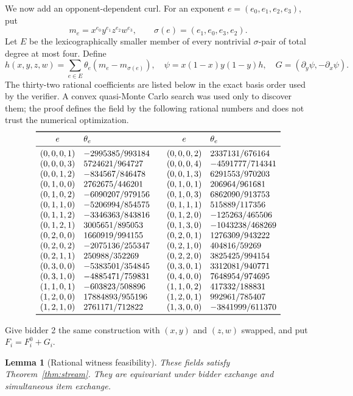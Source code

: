 \documentclass[11pt]{article}
\newtheorem{lemma}[theorem]{Lemma}
\begin{document}
We now add an opponent-dependent curl.  For an exponent
\(e=(e_0,e_1,e_2,e_3)\), put
\[
m_e=x^{e_0}y^{e_1}z^{e_2}w^{e_3},\qquad
\sigma(e)=(e_1,e_0,e_3,e_2).
\]
Let \(E\) be the lexicographically smaller member of every nontrivial
\(\sigma\)-pair of total degree at most four.  Define
\[
h(x,y,z,w)=\sum_{e\in E}\theta_e(m_e-m_{\sigma(e)}),
\quad
\psi=x(1-x)y(1-y)h,
\quad
G=(\partial_y\psi,-\partial_x\psi).
\]
The thirty-two rational coefficients are listed below in the exact basis
order used by the verifier.  A convex quasi-Monte Carlo search was used only
to discover them; the proof defines the field by the following rational
numbers and does not trust the numerical optimization.
\[
\begin{array}{cl@{\qquad}cl}
\toprule
e&\theta_e&e&\theta_e\\
\midrule
(0,0,0,1)&-2995385/993184&(0,0,0,2)&2337131/676164\\
(0,0,0,3)&5724621/964727&(0,0,0,4)&-4591777/714341\\
(0,0,1,2)&-834567/846478&(0,0,1,3)&6291553/970203\\
(0,1,0,0)&2762675/446201&(0,1,0,1)&206964/961681\\
(0,1,0,2)&-6090207/979156&(0,1,0,3)&6862090/913753\\
(0,1,1,0)&-5206994/854575&(0,1,1,1)&515889/117356\\
(0,1,1,2)&-3346363/843816&(0,1,2,0)&-125263/465506\\
(0,1,2,1)&3005651/895053&(0,1,3,0)&-1043238/468269\\
(0,2,0,0)&1660919/994155&(0,2,0,1)&1276309/943222\\
(0,2,0,2)&-2075136/255347&(0,2,1,0)&404816/59269\\
(0,2,1,1)&250988/352269&(0,2,2,0)&3825425/994154\\
(0,3,0,0)&-5383501/354845&(0,3,0,1)&3312081/940771\\
(0,3,1,0)&-4885471/759831&(0,4,0,0)&7648954/974695\\
(1,1,0,1)&-603823/508896&(1,1,0,2)&417332/188831\\
(1,2,0,0)&17884893/955196&(1,2,0,1)&992961/785407\\
(1,2,1,0)&2761171/712822&(1,3,0,0)&-3841999/611370\\
\bottomrule
\end{array}
\]

Give bidder 2 the same construction with \((x,y)\) and \((z,w)\) swapped,
and put \(F_i=F_i^0+G_i\).

\begin{lemma}[Rational witness feasibility]\label{lem:witness}
These fields satisfy Theorem~\ref{thm:stream}.  They are equivariant under
bidder exchange and simultaneous item exchange.
\end{lemma}
\end{document}
